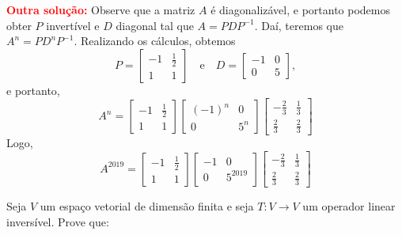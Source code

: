 \documentclass[11pt,a4paper]{article}
\begin{document}
{\textbf{\textcolor{Red}{Outra solução:}} Observe que a matriz $A$ é diagonalizável, e portanto podemos obter $P$ invertível e $D$ diagonal tal que $A = PDP^{-1}.$ Daí, teremos que $A^n = PD^{n}P^{-1}.$ Realizando os cálculos, obtemos 
\[
P = \begin{bmatrix}
-1 & \frac{1}{2} \\ 1 & 1 
\end{bmatrix} \quad \mbox{e} \quad D = \begin{bmatrix}
-1 &0 \\ 0 & 5 
\end{bmatrix},
\]
e portanto,
\[
A^n = \begin{bmatrix}
-1 & \frac{1}{2} \\ 1 & 1 
\end{bmatrix}  \begin{bmatrix}
(-1)^n &0 \\ 0 & 5^n 
\end{bmatrix} \begin{bmatrix}
-\frac{2}{3} & \frac{1}{3} \\ \frac{2}{3} &  \frac{2}{3} 
\end{bmatrix}
\]
Logo,
\[
A^{2019} = \begin{bmatrix}
-1 & \frac{1}{2} \\ 1 & 1 
\end{bmatrix}  \begin{bmatrix}
-1 &0 \\ 0 & 5^{2019} 
\end{bmatrix} \begin{bmatrix}
-\frac{2}{3} & \frac{1}{3} \\ \frac{2}{3} &  \frac{2}{3} 
\end{bmatrix}
\]
}
   
  Seja $V$ um espaço vetorial de dimensão finita e seja $T \colon V \to V$ um operador linear inversível. Prove que:
\end{document}

